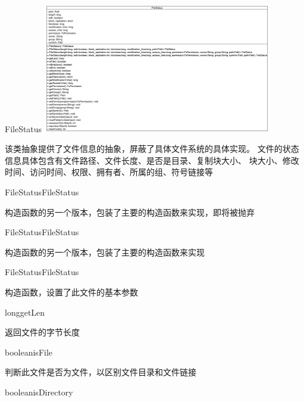 \begin{XeClass}{FileStatus}
\includegraphics[width=10cm]{cdig/FileStatus.png}
     
 该类抽象提供了文件信息的抽象，屏蔽了具体文件系统的具体实现。
 文件的状态信息具体包含有文件路径、文件长度、是否是目录、复制块大小、
 块大小、修改时间、访问时间、权限、拥有者、所属的组、符号链接等

    \begin{XeMethod}{\XePublic}{FileStatus}{FileStatus}
         
 构造函数的另一个版本，包装了主要的构造函数来实现，即将被抛弃

    \end{XeMethod}

    \begin{XeMethod}{\XePublic}{FileStatus}{FileStatus}
         
 构造函数的另一个版本，包装了主要的构造函数来实现

    \end{XeMethod}

    \begin{XeMethod}{\XePublic}{FileStatus}{FileStatus}
         
 构造函数，设置了此文件的基本参数

    \end{XeMethod}

    \begin{XeMethod}{\XePublic}{long}{getLen}
         
 返回文件的字节长度

    \end{XeMethod}

    \begin{XeMethod}{\XePublic}{boolean}{isFile}
         
 判断此文件是否为文件，以区别文件目录和文件链接

    \end{XeMethod}

    \begin{XeMethod}{\XePublic}{boolean}{isDirectory}
         

\end{XeMethod}
\end{XeClass}
